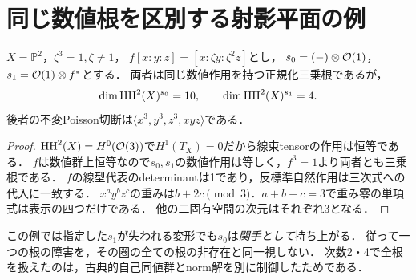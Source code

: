 \section{同じ数値根を区別する射影平面の例}
\label{sec:plane}
\begin{proposition}\label{prop:plane}
$X=\mathbb P^2$，$\zeta^3=1,\zeta\ne1$，
$f[x:y:z]=[x:\zeta y:\zeta^2z]$とし，
$s_0=(-)\otimes\mathcal O(1)$，$s_1=\mathcal O(1)\otimes f^*$とする．
両者は同じ数値作用を持つ正規化三乗根であるが，
\[
 \dim\operatorname{HH}^2(X)^{s_0}=10,\qquad \dim\operatorname{HH}^2(X)^{s_1}=4.
\]
後者の不変Poisson切断は$\langle x^3,y^3,z^3,xyz\rangle$である．
\end{proposition}
\begin{proof}
$\operatorname{HH}^2(X)=H^0(\mathcal O(3))$で$H^1(T_X)=0$だから線束tensorの作用は恒等である．
$f$は数値群上恒等なので$s_0,s_1$の数値作用は等しく，$f^3=1$より両者とも三乗根である．
$f$の線型代表のdeterminantは1であり，反標準自然作用は三次式への代入に一致する．
$x^ay^bz^c$の重みは$b+2c\pmod3$．$a+b+c=3$で重み零の単項式は表示の四つだけである．
他の二固有空間の次元はそれぞれ3となる．
\end{proof}

この例では指定した$s_1$が失われる変形でも$s_0$は\emph{関手として}持ち上がる．
従って一つの根の障害を，その圏の全ての根の非存在と同一視しない．
次数2・4で全根を扱えたのは，古典的自己同値群とnorm解を別に制御したためである．

